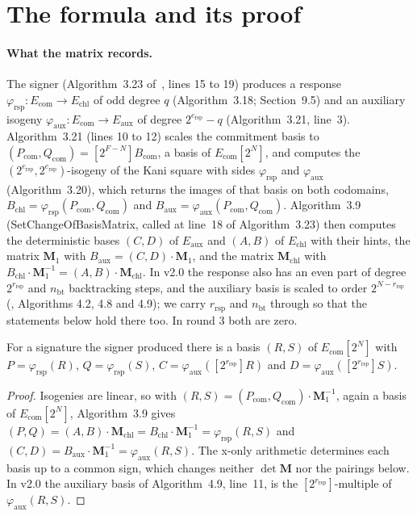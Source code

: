 \documentclass[version=preprint,notanonymous]{iacrcc}
\newcommand{\ers}{e_{\mathrm{rsp}}}
\newcommand{\nbt}{n_{\mathrm{bt}}}
\newcommand{\rrs}{r_{\mathrm{rsp}}}
\newcommand{\Mm}{\mathbf{M}}
\newcommand{\Echl}{E_{\mathrm{chl}}}
\newcommand{\Eaux}{E_{\mathrm{aux}}}
\newcommand{\Ecom}{E_{\mathrm{com}}}
\begin{document}
\section{The formula and its proof}
\label{sec:formula}

\paragraph{What the matrix records.}
The signer (Algorithm~3.23 of~\cite{sqisign-spec-r3}, lines 15 to 19)
produces a response $\varphi_{\mathrm{rsp}} : \Ecom \to \Echl$ of odd
degree $q$ (Algorithm~3.18; Section~9.5) and an auxiliary isogeny
$\varphi_{\mathrm{aux}} : \Ecom \to \Eaux$ of degree $2^{\ers} - q$
(Algorithm~3.21, line~3). Algorithm~3.21 (lines 10 to 12) scales the
commitment basis to $(P_{\mathrm{com}}, Q_{\mathrm{com}}) = [2^{F - N}]
B_{\mathrm{com}}$, a basis of $\Ecom[2^N]$, and computes the
$(2^{\ers}, 2^{\ers})$-isogeny of the Kani square with sides
$\varphi_{\mathrm{rsp}}$ and $\varphi_{\mathrm{aux}}$
(Algorithm~3.20), which returns the images of that basis on both
codomains, $B_{\mathrm{chl}} = \varphi_{\mathrm{rsp}}(P_{\mathrm{com}},
Q_{\mathrm{com}})$ and $B_{\mathrm{aux}} =
\varphi_{\mathrm{aux}}(P_{\mathrm{com}}, Q_{\mathrm{com}})$.
Algorithm~3.9 (SetChangeOfBasisMatrix, called at line~18 of
Algorithm~3.23) then computes the deterministic bases $(C, D)$ of $\Eaux$
and $(A, B)$ of $\Echl$ with their hints, the matrix $\Mm_1$ with
$B_{\mathrm{aux}} = (C, D) \cdot \Mm_1$, and the matrix
$\Mm_{\mathrm{chl}}$ with $B_{\mathrm{chl}} \cdot \Mm_1^{-1} = (A, B)
\cdot \Mm_{\mathrm{chl}}$. In v2.0 the response also has an even part of
degree $2^{\rrs}$ and $\nbt$ backtracking steps, and the auxiliary basis
is scaled to order $2^{N - \rrs}$ (\cite{sqisign-spec-r2}, Algorithms 4.2,
4.8 and 4.9); we carry $\rrs$ and $\nbt$ through so that the statements
below hold there too. In round 3 both are zero.

\begin{lemma}
\label{lem:records}
For a signature the signer produced there is a basis $(R, S)$ of
$\Ecom[2^N]$ with $P = \varphi_{\mathrm{rsp}}(R)$, $Q =
\varphi_{\mathrm{rsp}}(S)$, $C = \varphi_{\mathrm{aux}}([2^{\rrs}] R)$
and $D = \varphi_{\mathrm{aux}}([2^{\rrs}] S)$.
\end{lemma}

\begin{proof}
Isogenies are linear, so with $(R, S) = (P_{\mathrm{com}},
Q_{\mathrm{com}}) \cdot \Mm_1^{-1}$, again a basis of $\Ecom[2^N]$,
Algorithm~3.9 gives $(P, Q) = (A, B) \cdot \Mm_{\mathrm{chl}} =
B_{\mathrm{chl}} \cdot \Mm_1^{-1} = \varphi_{\mathrm{rsp}}(R, S)$ and
$(C, D) = B_{\mathrm{aux}} \cdot \Mm_1^{-1} = \varphi_{\mathrm{aux}}(R,
S)$. The x-only arithmetic determines each basis up to a common sign,
which changes neither $\det \Mm$ nor the pairings below. In v2.0 the
auxiliary basis of Algorithm~4.9, line~11, is the $[2^{\rrs}]$-multiple
of $\varphi_{\mathrm{aux}}(R, S)$.
\end{proof}
\end{document}
